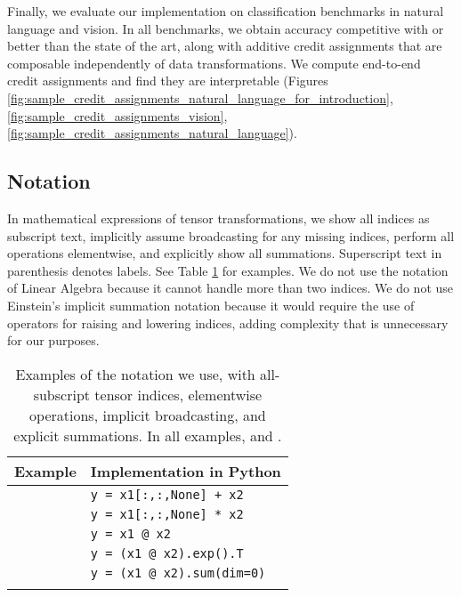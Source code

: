 \documentclass[11pt,a4paper]{article}
\begin{document}
Finally, we evaluate our implementation on classification benchmarks in natural language and vision. In all benchmarks, we obtain accuracy competitive with or better than the state of the art, along with additive credit assignments that are composable independently of data transformations. We compute end-to-end credit assignments and find they are interpretable (Figures \ref{fig:sample_credit_assignments_natural_language_for_introduction},  \ref{fig:sample_credit_assignments_vision}, \ref{fig:sample_credit_assignments_natural_language}).


\subsection{Notation}

In mathematical expressions of tensor transformations, we show all indices as subscript text, implicitly assume broadcasting for any missing indices, perform all operations elementwise, and explicitly show all summations. Superscript text in parenthesis denotes labels. See Table \ref{tab:notation_examples} for examples. We do not use the notation of Linear Algebra because it cannot handle more than two indices. We do not use Einstein's implicit summation notation because it would require the use of operators for raising and lowering indices, adding complexity that is unnecessary for our purposes.

\begin{table}[h]
	\small
	\begin{center}
		\begin{tabular}{@{}ll@{}}
			\toprule
			Example                                                              & Implementation in Python \\
			\midrule
			\addlinespace[0.6em]
			         & {\tt y = x1[:,:,None] + x2} \\
			\addlinespace[0.6em]
			           & {\tt y = x1[:,:,None] * x2} \\
			\addlinespace[0.6em]
			     & {\tt y = x1 @ x2} \\
			\addlinespace[0.6em]
			 & {\tt y = (x1 @ x2).exp().T} \\
			\addlinespace[0.6em]
			   & {\tt y = (x1 @ x2).sum(dim=0)} \\
			\addlinespace[0.6em]
			\bottomrule
		\end{tabular}
	\end{center}
	\caption{\label{tab:notation_examples}Examples of the notation we use, with all-subscript tensor indices, elementwise operations, implicit broadcasting, and explicit summations. In all examples,  and .}
\end{table}
\end{document}
